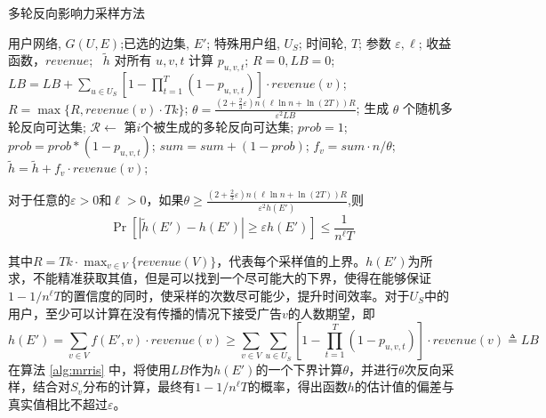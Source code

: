 \begin{algorithm}[H]
    \renewcommand{\algorithmcfname}{算法}
    \caption{多轮反向影响力采样方法\label{alg:mrris}}
    \begin{algorithmic}[1]
    \REQUIRE 用户网络, $G(U,E)$;已选的边集, $E'$; 特殊用户组, $U_S$; 时间轮, $T$; 参数 $\varepsilon,\ell$; 收益函数，$revenue$;
    \ $\tilde{h}$
    \STATE 对所有 $u,v,t$ 计算 $p_{u,v,t}$;
    \STATE $R = 0, LB = 0$;
        \STATE $LB = LB + \sum_{u \in U_S}[1- \prod_{t=1}^{T}(1-p_{u,v,t})]\cdot revenue(v)$;
        \STATE $R = \max\{R,revenue(v)\cdot Tk\}$;
    \ENDFOR
    \STATE $\theta=\frac{(2+\frac{2}{3}\varepsilon)n(\ell\ln n+\ln(2T))R}{\varepsilon^2LB}$;
    \STATE 生成 $\theta$ 个随机多轮反向可达集;
            \STATE $\mathcal{R} \leftarrow$ 第$i$个被生成的多轮反向可达集;
            \STATE $prob = 1$;
             \label{alg:mrrisline1}
                \STATE $prob = prob*(1-p_{u,v,t})$;
            \ENDFOR
            \STATE $sum=sum+(1-prob)$;\label{alg:mrrisline2}
        \ENDFOR
        \STATE $f_v = sum \cdot n / \theta$;
        \STATE $\tilde{h}= \tilde{h} + f_v\cdot revenue(v)$;
    \ENDFOR
    \end{algorithmic}
\end{algorithm}

\begin{lemma}
\label{lem:ris}
对于任意的$\varepsilon>0$和$\ell> 0$，如果$\theta \ge \frac{(2+\frac{2}{3}\varepsilon)n(\ell\ln n+\ln (2T))R}{\varepsilon^2h(E')} $,则
\begin{equation}
\Pr[|\tilde{h}(E')-h(E')|\ge \varepsilon h(E')] \le \frac{1}{n^{\ell}T}
\end{equation}
\end{lemma}
\noindent 其中$R=Tk\cdot \max_{v \in V}\{revenue(V)\}$，代表每个采样值的上界。$h(E')$为所求，不能精准获取其值，但是可以找到一个尽可能大的下界，使得在能够保证$1-1/n^\ell T$的置信度的同时，使采样的次数尽可能少，提升时间效率。对于$U_S$中的用户，至少可以计算在没有传播的情况下接受广告$v$的人数期望，即
\begin{equation}
    h(E')=\sum_{v\in V}f(E',v)\cdot revenue(v)\ge\sum_{v\in V}\sum_{u \in U_S}[1-\prod_{t=1}^{T}(1-p_{u,v,t})]\cdot revenue(v)\triangleq LB
\end{equation}
在算法 \ref{alg:mrris} 中，将使用$LB$作为$h(E')$的一个下界计算$\theta$，并进行$\theta$次反向采样，结合对$S_v$分布的计算，最终有$1-1/n^\ell T$的概率，得出函数$h$的估计值的偏差与真实值相比不超过$\varepsilon$。

